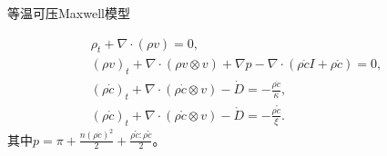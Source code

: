 \documentclass[mathserif]{beamer}
\begin{document}
	\begin{frame}{等温可压Maxwell模型}
 \begin{block}{}%
\begin{subequations}%
		\begin{align*}
			\rho_t + \nabla \cdot (\rho v) = 0, \\
			(\rho v)_t + \nabla \cdot (\rho v \otimes v) + \nabla p - \nabla \cdot ( \rho \dot{c} I +  \rho \mathring{c}) = 0, \\
			(\rho \dot{c})_t  + \nabla \cdot(\rho \dot{c} \otimes v) -  \dot{D} = - \frac{\rho \dot{c}}{\kappa}, \\
			(\rho \mathring{c})_t + \nabla \cdot (\rho \mathring{c} \otimes v) - \mathring{D} = - \frac{\rho \mathring{c}}{\xi}.
		\end{align*}
	\end{subequations}
	其中$p = \pi + \frac{n(\rho \dot{c})^2}{2} + \frac{\rho \mathring{c}:\rho \mathring{c}}{2}$。
\end{block}
	\end{frame}
\end{document}
